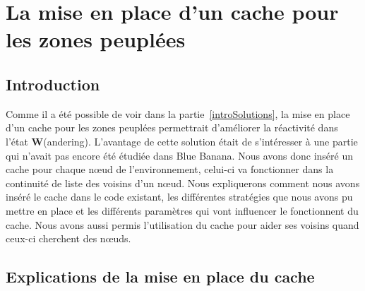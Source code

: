 \section{La mise en place d'un cache pour les zones peuplées}
\subsection{Introduction}
Comme il a été possible de voir dans la partie~\ref{introSolutions}, la mise en place d'un cache pour les zones peuplées permettrait d'améliorer la réactivité dans l'état \textbf{W}(andering). L'avantage de cette solution était de s'intéresser à une partie qui n'avait pas encore été étudiée dans Blue Banana. Nous avons donc inséré un cache pour chaque nœud de l'environnement, celui-ci va fonctionner dans la continuité de liste des voisins d'un nœud. Nous expliquerons comment nous avons inséré le cache dans le code existant, les différentes stratégies que nous avons pu mettre en place et les différents paramètres qui vont influencer le fonctionnent du cache. Nous avons aussi permis l'utilisation du cache pour aider ses voisins quand ceux-ci cherchent des nœuds.
 
\subsection{Explications de la mise en place du cache}

